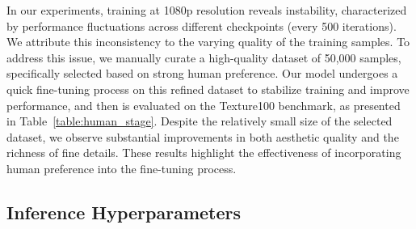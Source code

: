In our experiments, training at 1080p resolution reveals instability, characterized by performance fluctuations across different checkpoints (every 500 iterations). We attribute this inconsistency to the varying quality of the training samples. To address this issue, we manually curate a high-quality dataset of 50,000 samples, specifically selected based on strong human preference. Our model undergoes a quick fine-tuning process on this refined dataset to stabilize training and improve performance, and then is evaluated on the Texture100 benchmark, as presented in Table~\ref{table:human_stage}. Despite the relatively small size of the selected dataset, we observe substantial improvements in both aesthetic quality and the richness of fine details. These results highlight the effectiveness of incorporating human preference into the fine-tuning process.







\subsection{Inference Hyperparameters}

